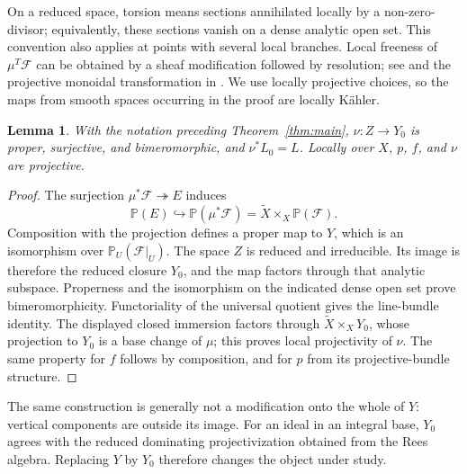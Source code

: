 \documentclass[11pt,reqno]{amsart}
\numberwithin{equation}{section}
\newtheorem{lemma}[theorem]{Lemma}
\theoremstyle{definition}
\theoremstyle{remark}
\newcommand{\FF}{\mathcal F}
\newcommand{\PP}{\mathbb P}
\begin{document}
On a reduced space, torsion means sections annihilated locally by a non-zero-divisor; equivalently, these sections vanish on a dense analytic open set. This convention also applies at points with several local branches. Local freeness of $\mu^T\FF$ can be obtained by a sheaf modification followed by resolution; see \cite{Riemenschneider} and the projective monoidal transformation in \cite[Theorem 2.3]{RuppenthalSera}. We use locally projective choices, so the maps from smooth spaces occurring in the proof are locally K\"ahler.

\begin{lemma}\label{lem:diagram}
With the notation preceding Theorem~\ref{thm:main}, $\nu:Z\to Y_0$ is proper, surjective, and bimeromorphic, and $\nu^*L_0=L$. Locally over $X$, $p$, $f$, and $\nu$ are projective.
\end{lemma}
\begin{proof}
The surjection $\mu^*\FF\twoheadrightarrow E$ induces
\[
 \PP(E)\hookrightarrow\PP(\mu^*\FF)
   =\widetilde X\times_X\PP(\FF).
\]
Composition with the projection defines a proper map to $Y$, which is an isomorphism over $\PP_U(\FF|_U)$. The space $Z$ is reduced and irreducible. Its image is therefore the reduced closure $Y_0$, and the map factors through that analytic subspace. Properness and the isomorphism on the indicated dense open set prove bimeromorphicity. Functoriality of the universal quotient gives the line-bundle identity. The displayed closed immersion factors through $\widetilde X\times_XY_0$, whose projection to $Y_0$ is a base change of $\mu$; this proves local projectivity of $\nu$. The same property for $f$ follows by composition, and for $p$ from its projective-bundle structure.
\end{proof}

The same construction is generally not a modification onto the whole of $Y$: vertical components are outside its image. For an ideal in an integral base, $Y_0$ agrees with the reduced dominating projectivization obtained from the Rees algebra. Replacing $Y$ by $Y_0$ therefore changes the object under study.
\end{document}
